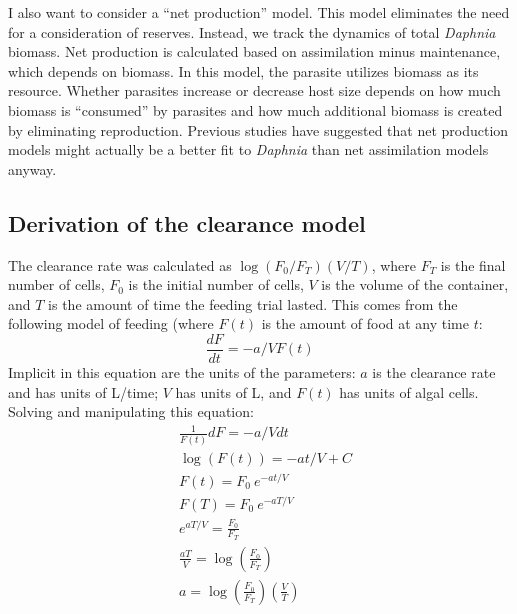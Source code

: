 \documentclass[12pt,reqno,final,pdftex]{amsart}\usepackage[]{graphicx}\usepackage[]{color}
\theoremstyle{plain}
\numberwithin{equation}{part}
\begin{document}
I also want to consider a ``net production'' model.
This model eliminates the need for a consideration of reserves.
Instead, we track the dynamics of total \emph{Daphnia} biomass.
Net production is calculated based on assimilation minus maintenance, which depends on biomass.
In this model, the parasite utilizes biomass as its resource.
Whether parasites increase or decrease host size depends on how much biomass is ``consumed'' by parasites and how much additional biomass is created by eliminating reproduction.
Previous studies have suggested that net production models might actually be a better fit to \emph{Daphnia} than net assimilation models anyway.

\subsection*{Derivation of the clearance model}
The clearance rate was calculated as $\log(F_0/F_T) (V/T)$, where $F_T$ is the final number of cells, $F_0$ is the initial number of cells, $V$ is the volume of the container, and $T$ is the amount of time the feeding trial lasted.
This comes from the following model of feeding (where $F(t)$ is the amount of food at any time $t$:
\begin{equation}
\frac{dF}{dt} = -a/V F(t)
\end{equation}
Implicit in this equation are the units of the parameters: $a$ is the clearance rate and has units of L/time; $V$ has units of L, and $F(t)$ has units of algal cells.
Solving and manipulating this equation:
\begin{align*}
&\frac{1}{F(t)} dF = -a/V dt \\
&\log(F(t)) = -at/V + C \\
&F(t) = F_0~e^{-at/V} \\
&F(T) = F_0~e^{-aT/V} \\
&e^{aT/V} = \frac{F_0}{F_T} \\
&\frac{aT}{V} = \log\left(\frac{F_0}{F_T}\right) \\
& a = \log\left(\frac{F_0}{F_T}\right) \left(\frac{V}{T}\right)
\end{align*}
\end{document}
